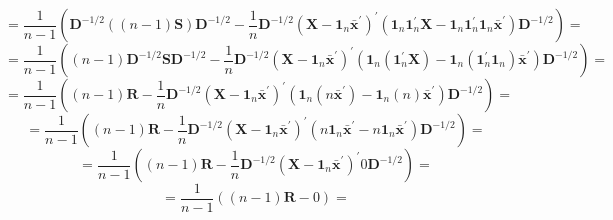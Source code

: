 \[
    =
    \frac{1}{n-1}
    {\left(
        \textbf{D}^{-1/2}
        ((n-1)\textbf{S})
        \textbf{D}^{-1/2}
        -
        \frac{1}{n}
        \textbf{D}^{-1/2}
        {\left(\textbf{X} - \textbf{1}_{n}{\bar{\textbf{x}}}^{\prime}\right)}^{\prime}
        \left(
            \textbf{1}_{n}
            \textbf{1}_{n}^{\prime}
            \textbf{X}
            - 
            \textbf{1}_{n}
            \textbf{1}_{n}^{\prime}
            \textbf{1}_{n}{\bar{\textbf{x}}}^{\prime}
        \right)
        \textbf{D}^{-1/2}
    \right)}
    =
\]
\[
    =
    \frac{1}{n-1}
    {\left(
        (n-1)
        \textbf{D}^{-1/2}
        \textbf{S}
        \textbf{D}^{-1/2}
        -
        \frac{1}{n}
        \textbf{D}^{-1/2}
        {\left(\textbf{X} - \textbf{1}_{n}{\bar{\textbf{x}}}^{\prime}\right)}^{\prime}
        \left(
            \textbf{1}_{n}
            \left(
                \textbf{1}_{n}^{\prime}
                \textbf{X}
            \right)
            - 
            \textbf{1}_{n}
            \left(
                \textbf{1}_{n}^{\prime}
                \textbf{1}_{n}
            \right)
            {\bar{\textbf{x}}}^{\prime}
        \right)
        \textbf{D}^{-1/2}
    \right)}
    =
\]
\[
    =
    \frac{1}{n-1}
    {\left(
        (n-1)
        \textbf{R}
        -
        \frac{1}{n}
        \textbf{D}^{-1/2}
        {\left(\textbf{X} - \textbf{1}_{n}{\bar{\textbf{x}}}^{\prime}\right)}^{\prime}
        \left(
            \textbf{1}_{n}
            \left(
                n
                {\bar{\textbf{x}}}^{\prime}
            \right)
            - 
            \textbf{1}_{n}
            \left(
                n
            \right)
            {\bar{\textbf{x}}}^{\prime}
        \right)
        \textbf{D}^{-1/2}
    \right)}
    =
\]
\[
    =
    \frac{1}{n-1}
    {\left(
        (n-1)
        \textbf{R}
        -
        \frac{1}{n}
        \textbf{D}^{-1/2}
        {\left(\textbf{X} - \textbf{1}_{n}{\bar{\textbf{x}}}^{\prime}\right)}^{\prime}
        \left(
            n
            \textbf{1}_{n}
            {\bar{\textbf{x}}}^{\prime}
            - 
            n
            \textbf{1}_{n}
            {\bar{\textbf{x}}}^{\prime}
        \right)
        \textbf{D}^{-1/2}
    \right)}
    =
\]
\[
    =
    \frac{1}{n-1}
    {\left(
        (n-1)
        \textbf{R}
        -
        \frac{1}{n}
        \textbf{D}^{-1/2}
        {\left(\textbf{X} - \textbf{1}_{n}{\bar{\textbf{x}}}^{\prime}\right)}^{\prime}
        0
        \textbf{D}^{-1/2}
    \right)}
    =
\]
\[
    =
    \frac{1}{n-1}
    {\left(
        (n-1)
        \textbf{R}
        -
        0
    \right)}
    =
\]
